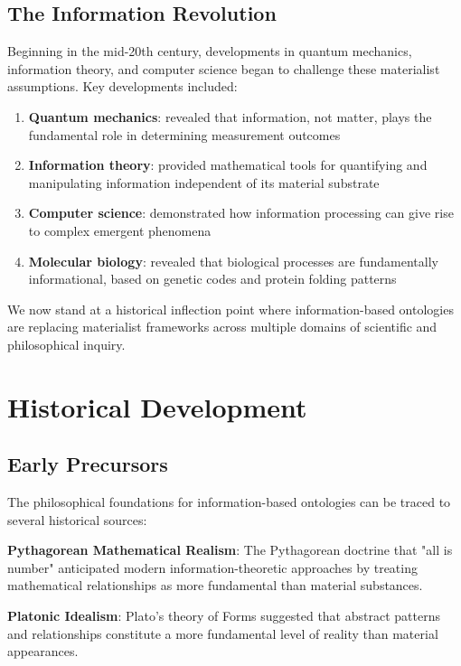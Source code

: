 \documentclass[12pt]{article}
\begin{document}
\subsection{The Information Revolution}

Beginning in the mid-20th century, developments in quantum mechanics, information theory, and computer science began to challenge these materialist assumptions. Key developments included:

\begin{enumerate}
\item \textbf{Quantum mechanics}: revealed that information, not matter, plays the fundamental role in determining measurement outcomes
\item \textbf{Information theory}: provided mathematical tools for quantifying and manipulating information independent of its material substrate
\item \textbf{Computer science}: demonstrated how information processing can give rise to complex emergent phenomena
\item \textbf{Molecular biology}: revealed that biological processes are fundamentally informational, based on genetic codes and protein folding patterns
\end{enumerate}

We now stand at a historical inflection point where information-based ontologies are replacing materialist frameworks across multiple domains of scientific and philosophical inquiry.

\section{Historical Development}

\subsection{Early Precursors}

The philosophical foundations for information-based ontologies can be traced to several historical sources:

\textbf{Pythagorean Mathematical Realism}: The Pythagorean doctrine that "all is number" anticipated modern information-theoretic approaches by treating mathematical relationships as more fundamental than material substances. 

\textbf{Platonic Idealism}: Plato's theory of Forms suggested that abstract patterns and relationships constitute a more fundamental level of reality than material appearances.
\end{document}
